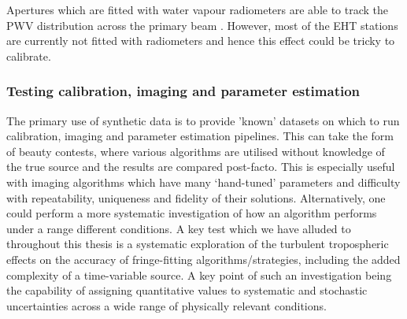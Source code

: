 
Apertures which are fitted with water vapour radiometers are able to track the PWV distribution across the primary beam \citep{Lamb_1998}. However, most of the EHT stations are currently not fitted with radiometers and hence this effect could be tricky to calibrate.

\subsubsection{Testing calibration, imaging and parameter estimation}

The primary use of synthetic data is to provide 'known' datasets on which to run calibration, imaging and parameter estimation pipelines. This can take the form of beauty contests, where various algorithms are utilised without knowledge of the true source and the results are compared post-facto. This is especially useful with imaging algorithms which have many `hand-tuned' parameters and difficulty with repeatability, uniqueness and fidelity of their solutions. Alternatively, one could perform a more systematic investigation of how an algorithm performs under a range different conditions. A key test which we have alluded to throughout this thesis is a systematic exploration of the turbulent tropospheric effects on the accuracy of fringe-fitting algorithms/strategies, including the added complexity of a time-variable source. A key point of such an investigation being the capability of assigning quantitative values to systematic and stochastic uncertainties across a wide range of physically relevant conditions.



